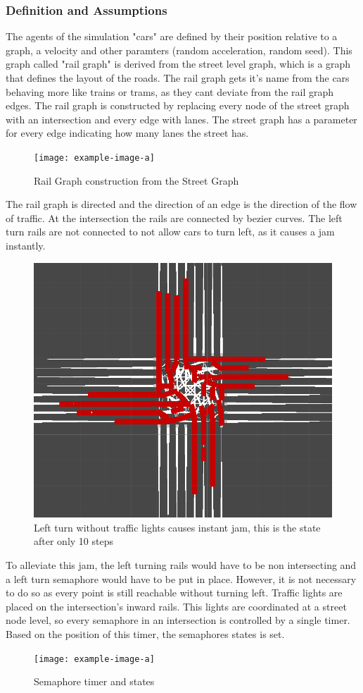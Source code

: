 \documentclass{article}
\begin{document}
\subsubsection{Definition and Assumptions}
The agents of the simulation "cars" are defined by their position relative to a graph, a velocity and other paramters (random acceleration, random seed). This graph called "rail graph" is derived from the street level graph, which is a graph that defines the layout of the roads. The rail graph gets it's name from the cars behaving more like trains or trams, as they cant deviate from the rail graph edges. The rail graph is constructed by replacing every node of the street graph with an intersection and every edge with lanes. The street graph has a parameter for every edge indicating how many lanes the street has.
\begin{figure}[H]
\texttt{[image: example-image-a]}
\caption{Rail Graph construction from the Street Graph}
\end{figure}
\bigskip 
 The rail graph is directed and the direction of an edge is the direction of the flow of traffic. At the intersection the rails are connected by bezier curves. The left turn rails are not connected to not allow cars to turn left, as it causes a jam instantly.
\begin{figure}[H]
\includegraphics[width=\textwidth]{gridlock}
\caption{Left turn without traffic lights causes instant jam, this is the state after only 10 steps}
\end{figure}
\bigskip 
 To alleviate this jam, the left turning rails would have to be non intersecting and a left turn semaphore would have to be put in place. However, it is not necessary to do so as every point is still reachable without turning left.
Traffic lights are placed on the intersection's inward rails. This lights are coordinated at a street node level, so every semaphore in an intersection is controlled by a single timer. Based on the position of this timer, the semaphores states is set.
\begin{figure}[H]
\texttt{[image: example-image-a]}
\caption{Semaphore timer and states}
\end{figure}
\end{document}
